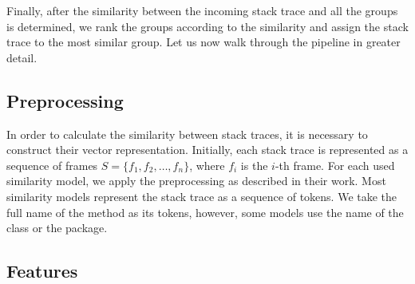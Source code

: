 Finally, after the similarity between the incoming stack trace and all the groups is determined, we rank the groups according to the similarity and assign the stack trace to the most similar group. Let us now walk through the pipeline in greater detail.

\subsection{Preprocessing}
In order to calculate the similarity between stack traces, it is necessary to construct their vector representation. 
Initially, each stack trace 
is represented as a sequence of frames $S=\{f_1, f_2, \ldots, f_n\}$, where $f_i$ is the $i$-th frame. 
For each used similarity model, we apply the preprocessing as described in their work.
Most similarity models represent the stack trace as a sequence of tokens.
We take the full name of the method as its tokens, however, some models use the name of the class or the package.

\subsection{Features}\label{sec:features}

